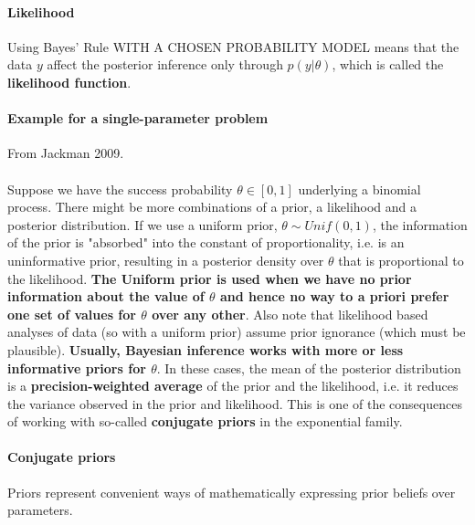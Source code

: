 \documentclass {article}
\begin{document}
\paragraph{Likelihood}
Using Bayes' Rule WITH A CHOSEN PROBABILITY MODEL means that the data $y$ affect the posterior inference only through $p(y | \theta)$, which is called the \textbf{likelihood function}. 

\paragraph {Example for a single-parameter problem}
From Jackman 2009.
\\
\\
Suppose we have the success probability $\theta \in [0,1]$ underlying a binomial process. There might be more combinations of a prior, a likelihood and a posterior distribution.
If we use a uniform prior, $\theta \sim Unif(0,1)$, the information of the prior is "absorbed" into the constant of proportionality, i.e. is an uninformative prior, resulting in a posterior density over $\theta$ that is proportional to the likelihood.      
\textbf{The Uniform prior is used when we have no prior information about the value of $\theta$ and hence no way to a priori prefer one set of values for $\theta$ over any other}.
Also note that likelihood based analyses of data (so with a uniform prior) assume prior ignorance (which must be plausible). 
\textbf{Usually, Bayesian inference works with more or less informative priors for $\theta$}.
In these cases, the mean of the posterior distribution is a \textbf{precision-weighted average} of the prior and the likelihood, i.e. it reduces the variance observed in the prior and likelihood.  
This is one of the consequences of working with so-called \textbf{conjugate priors} in the exponential family. 

\paragraph{Conjugate priors}
Priors represent convenient ways of mathematically expressing prior beliefs over parameters.
  
\end{document}

